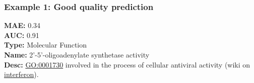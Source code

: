 \documentclass[aspectratio=169, 9pt]{beamer}
\begin{document}
\begin{frame}[t, label=phylo-good]
	\frametitle{Example 1: Good quality prediction}
	
	\begin{minipage}[m]{.3\linewidth}
		\small
		\textbf{MAE:} 0.34 \\
		\textbf{AUC:} 0.91 \\
		\textbf{Type:} Molecular Function\\
		\textbf{Name:} 2'-5'-oligoadenylate synthetase activity\\
		\textbf{Desc:}  \href{http://amigo.geneontology.org/amigo/term/GO:0001730}{\alert{GO:0001730}} involved in the process of cellular antiviral activity (wiki on \href{https://en.wikipedia.org/wiki/Interferon}{\alert{interferon}}).
		\vfill
		\hyperlink{phylo-bad}{}
	\end{minipage}
	\begin{minipage}[m]{.65\linewidth}
		\def\tmpwdth{.9\linewidth}
\end{minipage}
\end{frame}
\end{document}

